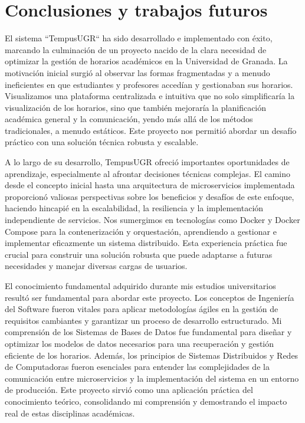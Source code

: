 \chapter{Conclusiones y trabajos futuros}\label{cap:conclusiones}

El sistema ``TempusUGR`` ha sido desarrollado e implementado con éxito, marcando la culminación de un proyecto nacido de la clara necesidad de optimizar la gestión de horarios académicos en la Universidad de Granada. La motivación inicial surgió al observar las formas fragmentadas y a menudo ineficientes en que estudiantes y profesores accedían y gestionaban sus horarios. Visualizamos una plataforma centralizada e intuitiva que no solo simplificaría la visualización de los horarios, sino que también mejoraría la planificación académica general y la comunicación, yendo más allá de los métodos tradicionales, a menudo estáticos. Este proyecto nos permitió abordar un desafío práctico con una solución técnica robusta y escalable.\newline

A lo largo de su desarrollo, TempusUGR ofreció importantes oportunidades de aprendizaje, especialmente al afrontar decisiones técnicas complejas. El camino desde el concepto inicial hasta una arquitectura de microservicios implementada proporcionó valiosas perspectivas sobre los beneficios y desafíos de este enfoque, haciendo hincapié en la escalabilidad, la resiliencia y la implementación independiente de servicios. Nos sumergimos en tecnologías como Docker y Docker Compose para la contenerización y orquestación, aprendiendo a gestionar e implementar eficazmente un sistema distribuido. Esta experiencia práctica fue crucial para construir una solución robusta que puede adaptarse a futuras necesidades y manejar diversas cargas de usuarios.\newline

El conocimiento fundamental adquirido durante mis estudios universitarios resultó ser fundamental para abordar este proyecto. Los conceptos de Ingeniería del Software fueron vitales para aplicar metodologías ágiles en la gestión de requisitos cambiantes y garantizar un proceso de desarrollo estructurado. Mi comprensión de los Sistemas de Bases de Datos fue fundamental para diseñar y optimizar los modelos de datos necesarios para una recuperación y gestión eficiente de los horarios. Además, los principios de Sistemas Distribuidos y Redes de Computadoras fueron esenciales para entender las complejidades de la comunicación entre microservicios y la implementación del sistema en un entorno de producción. Este proyecto sirvió como una aplicación práctica del conocimiento teórico, consolidando mi comprensión y demostrando el impacto real de estas disciplinas académicas.\newline

